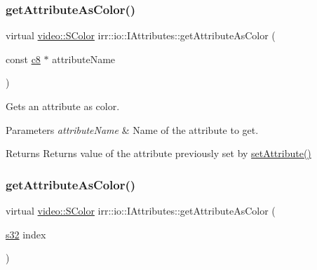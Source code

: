 \subsubsection{\texorpdfstring{get\+Attribute\+As\+Color()}{getAttributeAsColor()}\hspace{0.1cm}{\footnotesize\ttfamily [2/4]}}
{\footnotesize\ttfamily virtual \hyperlink{classirr_1_1video_1_1SColor}{video\+::\+S\+Color} irr\+::io\+::\+I\+Attributes\+::get\+Attribute\+As\+Color (\begin{DoxyParamCaption}\item[{const \hyperlink{namespaceirr_a9395eaea339bcb546b319e9c96bf7410}{c8} $\ast$}]{attribute\+Name }\end{DoxyParamCaption})\hspace{0.3cm}{\ttfamily [pure virtual]}}



Gets an attribute as color. 


\begin{DoxyParams}{Parameters}
{\em attribute\+Name} & Name of the attribute to get. \\
\hline
\end{DoxyParams}
\begin{DoxyReturn}{Returns}
Returns value of the attribute previously set by \hyperlink{classirr_1_1io_1_1IAttributes_a03fa31acb481ae23678676cc183f09a6}{set\+Attribute()} 
\end{DoxyReturn}
\mbox{\label{classirr_1_1io_1_1IAttributes_ac3ef831227f7c9383e3e9144ae877c60}} 
\subsubsection{\texorpdfstring{get\+Attribute\+As\+Color()}{getAttributeAsColor()}\hspace{0.1cm}{\footnotesize\ttfamily [3/4]}}
{\footnotesize\ttfamily virtual \hyperlink{classirr_1_1video_1_1SColor}{video\+::\+S\+Color} irr\+::io\+::\+I\+Attributes\+::get\+Attribute\+As\+Color (\begin{DoxyParamCaption}\item[{\hyperlink{namespaceirr_ac66849b7a6ed16e30ebede579f9b47c6}{s32}}]{index }\end{DoxyParamCaption})\hspace{0.3cm}{\ttfamily [pure virtual]}}



